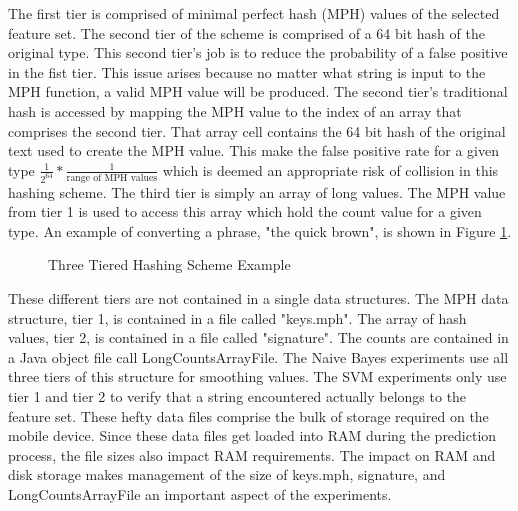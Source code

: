 		The first tier is comprised of minimal perfect hash (MPH) values of the selected feature set.  The second tier of the scheme is comprised of a 64 bit hash of the original type.  This second tier's job is to reduce the probability of a false positive in the fist tier.  This issue arises because no matter what string is input to the MPH function, a valid MPH value will be produced.  The second tier's traditional hash is accessed by mapping the MPH value to the index of an array that comprises the second tier.  That array cell contains the 64 bit hash of the original text used to create the MPH value.  This make the false positive rate for a given type $\frac{1}{2^{64}} * \frac{1}{\text{range of MPH values}}$ which is deemed an appropriate risk of collision in this hashing scheme.  The third tier is simply an array of long values.  The MPH value from tier 1 is used to access this array which hold the count value for a given type.  An example of converting a phrase, "the quick brown", is shown in Figure \ref{fig:3tierHashExample}. 
		
		\begin{figure}[ht!]
			\begin{center}
				\caption{Three Tiered Hashing Scheme Example}
				\label{fig:3tierHashExample}
			\end{center}
		\end{figure}
		
		These different tiers are not contained in a single data structures.  The MPH data structure, tier 1, is contained in a file called "keys.mph".  The array of hash values, tier 2, is contained in a file called "signature".  The counts are contained in a Java object file call LongCountsArrayFile.  The Naive Bayes experiments use all three tiers of this structure for smoothing values.  The SVM experiments only use tier 1 and tier 2 to verify that a string encountered actually belongs to the feature set.  These hefty data files comprise the bulk of storage required on the mobile device.  Since these data files get loaded into RAM during the prediction process, the file sizes also impact RAM requirements. The impact on RAM and disk storage makes management of the size of keys.mph, signature, and LongCountsArrayFile an important aspect of the experiments.

